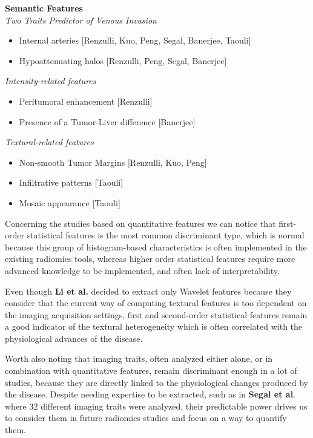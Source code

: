 \documentclass[]{article}
\begin{document}
\begin{table}{}
\textbf{Semantic Features} \\ 
\emph{Two Traits Predictor of Venous Invasion}
\begin{itemize}
\item
  Internal arteries {[}Renzulli, Kuo, Peng, Segal, Banerjee, Taouli{]}
\item
  Hypoattenuating halos {[}Renzulli, Peng, Segal, Banerjee{]}
\end{itemize}
\emph{Intensity-related features}
\begin{itemize}
\item
  Peritumoral enhancement {[}Renzulli{]}
\item
  Presence of a Tumor-Liver difference {[}Banerjee{]}
\end{itemize}
\emph{Textural-related features}

\begin{itemize}
\item
  Non-smooth Tumor Margins {[}Renzulli, Kuo, Peng{]}
\item
  Infiltrative patterns {[}Taouli{]}
\item
  Mosaic appearance {[}Taouli{]}
\end{itemize}
\end{table}

Concerning the studies based on quantitative features we can notice that
first-order statistical features is the most common discriminant type,
which is normal because this group of histogram-based characteristics is
often implemented in the existing radiomics tools, whereas higher order
statistical features require more advanced knowledge to be implemented,
and often lack of interpretability.

Even though \textbf{Li et al.} decided to extract only Wavelet features
because they consider that the current way of computing textural
features is too dependent on the imaging acquisition settings, first and
second-order statistical features remain a good indicator of the
textural heterogeneity which is often correlated with the physiological
advances of the disease.

Worth also noting that imaging traits, often analyzed either alone, or
in combination with quantitative features, remain discriminant enough in
a lot of studies, because they are directly linked to the physiological
changes produced by the disease. Despite needing expertise to be
extracted, such as in \textbf{Segal et al}. where 32 different imaging
traits were analyzed, their predictable power drives us to consider them
in future radiomics studies and focus on a way to quantify them.
\end{document}
